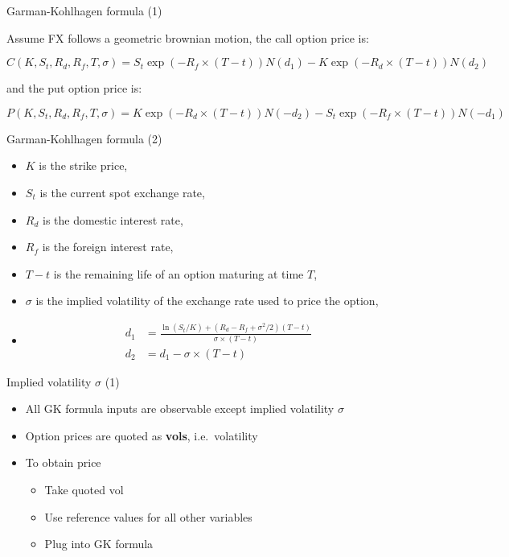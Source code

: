 \documentclass[ignorenonframetext,aspectratio=169]{beamer}
\providecommand{\tightlist}{%
  \setlength{\itemsep}{0pt}\setlength{\parskip}{0pt}}
\begin{document}
\begin{frame}{Garman-Kohlhagen formula (1)}

Assume FX follows a geometric brownian motion, the call option price is:

\[
\boxed{
C(K,S_t,R_d,R_f,T,\sigma) = S_t \exp(-R_f\times(T-t))N(d_1) - K\exp(-R_d \times (T-t))N(d_2)
}
\]

and the put option price is:

\[
\boxed{
P(K,S_t,R_d,R_f,T,\sigma) = K\exp(-R_d \times (T-t))N(-d_2) - S_t \exp(-R_f\times(T-t))N(-d_1) 
}
\]

\end{frame}

\begin{frame}{Garman-Kohlhagen formula (2)}

\begin{itemize}
\tightlist
\item
  \(K\) is the strike price,
\item
  \(S_t\) is the current spot exchange rate,
\item
  \(R_d\) is the domestic interest rate,
\item
  \(R_f\) is the foreign interest rate,
\item
  \(T-t\) is the remaining life of an option maturing at time \(T\),
\item
  \(\sigma\) is the implied volatility of the exchange rate used to
  price the option,
\item
  \[
  \begin{aligned}
  d_1 &= \frac{\ln(S_t/K)+(R_d-R_f+\sigma^2/2)(T-t)}{\sigma \times (T-t)}\\
  d_2 &= d_1 - \sigma \times (T-t)
  \end{aligned}
  \]
\end{itemize}

\end{frame}

\begin{frame}{Implied volatility \(\sigma\) (1)}

\begin{itemize}
\tightlist
\item
  All GK formula inputs are observable except implied volatility
  \(\sigma\)\\[2\baselineskip]
\item
  Option prices are quoted as \textbf{vols},
  i.e.~volatility\\[2\baselineskip]
\item
  To obtain price

  \begin{itemize}
  \tightlist
  \item
    Take quoted vol
  \item
    Use reference values for all other variables
  \item
    Plug into GK formula
  \end{itemize}
\end{itemize}

\end{frame}
\end{document}
